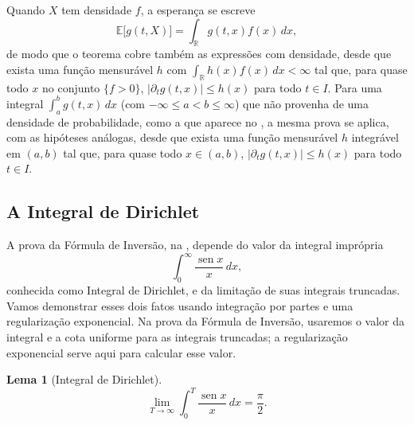 \documentclass[12pt,portuguese]{article}
\theoremstyle{definition}
\newtheorem{lemma}[lemma]{Lema}
\theoremstyle{plainexercise}
\theoremstyle{starredexercise}
\theoremstyle{definition}
\renewcommand{\sin}{\operatorname{sen}}
\begin{document}
Quando $X$ tem densidade $f$, a esperança se escreve
\[
\mathbb{E}\bigl[g(t,X)\bigr]=\int_{\mathbb{R}}g(t,x)f(x)\,dx,
\]
de modo que o teorema cobre também as expressões com densidade, desde que
exista uma função mensurável $h$ com $\int_{\mathbb{R}}h(x)f(x)\,dx<\infty$ tal
que, para quase todo $x$ no conjunto $\{f>0\}$,
$\bigl|\partial_t g(t,x)\bigr|\leqslant h(x)$ para todo $t\in I$. Para uma
integral $\int_a^b g(t,x)\,dx$ (com $-\infty\leqslant a<b\leqslant\infty$) que
não provenha de uma densidade de probabilidade, como a que aparece no
, a mesma prova se aplica, com as hipóteses análogas,
desde que exista uma função mensurável $h$ integrável em $(a,b)$ tal que, para
quase todo $x\in(a,b)$, $\bigl|\partial_t g(t,x)\bigr|\leqslant h(x)$ para todo
$t\in I$.

\subsection{A Integral de Dirichlet}\label{subsec:dirichlet}

A prova da Fórmula de Inversão, na , depende do valor da
integral imprópria
\[
\int_0^\infty \frac{\sin x}{x}\,dx,
\]
conhecida como Integral de Dirichlet, e da limitação de suas integrais
truncadas. Vamos demonstrar esses dois fatos usando integração por partes e
uma regularização exponencial. Na prova da Fórmula de Inversão, usaremos o
valor da integral e a cota uniforme para as integrais truncadas; a
regularização exponencial serve aqui para calcular esse valor.

\begin{lemma}[Integral de Dirichlet]\label{lem:dirichlet}
\[
\lim_{T\to\infty}\int_0^T \frac{\sin x}{x}\,dx=\frac{\pi}{2}.
\]
\end{lemma}
\end{document}
